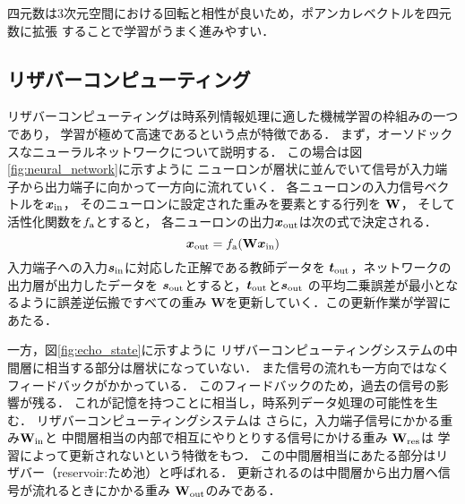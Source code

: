 \documentclass[uplatex,a4paper,10pt]{jsarticle}
\begin{document}
四元数は3次元空間における回転と相性が良いため，ポアンカレベクトルを四元数に拡張
することで学習がうまく進みやすい．


\subsection{リザバーコンピューティング}

リザバーコンピューティングは時系列情報処理に適した機械学習の枠組みの一つであり，
学習が極めて高速であるという点が特徴である．
まず，オーソドックスなニューラルネットワークについて説明する．
この場合は図\ref{fig:neural_network}に示すように
ニューロンが層状に並んでいて信号が入力端子から出力端子に向かって一方向に流れていく．
各ニューロンの入力信号ベクトルを$\bm{x}_{\rm{in}}$，
そのニューロンに設定された重みを要素とする行列を
$\bf{W}$，
そして活性化関数を$f_{\rm{a}}$とすると，
各ニューロンの出力$\bm{x}_{\rm{out}}$は次の式で決定される．
\begin{equation}
    \bm{x}_{\rm{out}} = f_{\rm{a}}(\mathbf{W} \bm{x}_{\rm{in}})
\end{equation}
入力端子への入力$\bm{s}_{\rm{in}}$に対応した正解である教師データを
$\bm{t}_{\rm{out}}$，ネットワークの出力層が出力したデータを
$\bm{s}_{\rm{out}}$とすると，$\bm{t}_{\rm{out}}$と${\bm{s}_{\rm{out}}}$
の平均二乗誤差が最小となるように誤差逆伝搬ですべての重み
$\mathbf{W}$を更新していく．この更新作業が学習にあたる．

一方，図\ref{fig:echo_state}に示すように
リザバーコンピューティングシステムの中間層に相当する部分は層状になっていない．
また信号の流れも一方向ではなくフィードバックがかかっている．
このフィードバックのため，過去の信号の影響が残る．
これが記憶を持つことに相当し，時系列データ処理の可能性を生む．
リザバーコンピューティングシステムは
さらに，入力端子信号にかかる重み$\mathbf{W_{\rm{in}}}$と
中間層相当の内部で相互にやりとりする信号にかける重み
$\mathbf{W_{\rm{res}}}$は
学習によって更新されないという特徴をもつ．
この中間層相当にあたる部分はリザバー（reservoir:ため池）と呼ばれる．
更新されるのは中間層から出力層へ信号が流れるときにかかる重み
$\mathbf{W}_{\rm{out}}$のみである．
\end{document}
